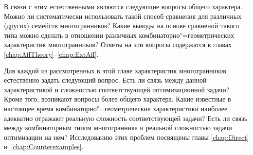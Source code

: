 В связи с этим естественными являются следующие вопросы общего характера. Можно ли систематически использовать такой способ сравнения для различных (других) семейств многогранников? 
Какие выводы на основе сравнений такого типа можно сделать в отношении различных комбинаторно"=геометрических характеристик многогранников?
Ответы на эти вопросы содержатся в главах \ref{chap:AffTheory}--\ref{chap:ExtAff}.


Для каждой из рассмотренных в этой главе характеристик многогранников естественно задать следующий вопрос.
Есть ли связь между данной характеристикой и сложностью соответствующей оптимизационной задачи?
Кроме того, возникают вопросы более общего характера.
Какие известные в настоящее время комбинаторно"=геометрические характеристики  наиболее адекватно отражают реальную сложность соответствующей задачи?
Есть ли связь между комбинаторным типом многогранника и реальной сложностью задачи оптимизации на нем?
Исследованию этих проблем посвящены главы \ref{chap:Direct} и~\ref{chap:Counterexamples}.
